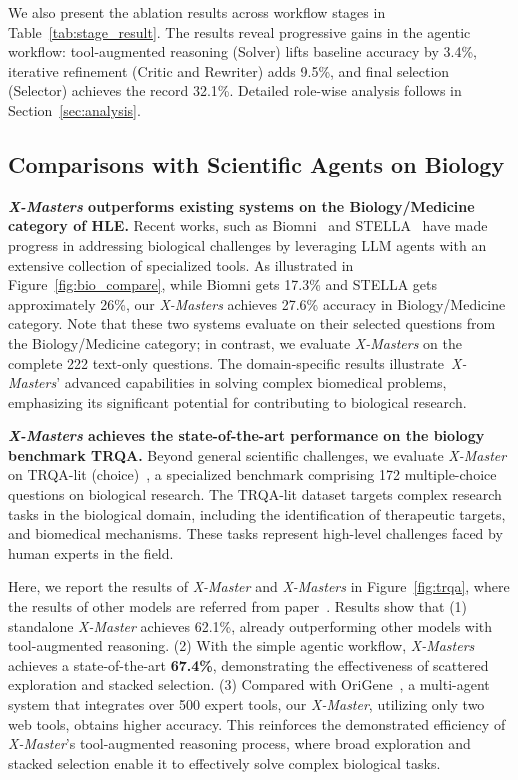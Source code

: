 \documentclass{article}
\begin{document}
We also present the ablation results across workflow stages in Table~\ref{tab:stage_result}. The results reveal progressive gains in the agentic workflow: tool-augmented reasoning (Solver) lifts baseline accuracy by 3.4\%, iterative refinement (Critic and Rewriter) adds 9.5\%, and final selection (Selector) achieves the record 32.1\%. Detailed role-wise analysis follows in Section~\ref{sec:analysis}. 

\subsection{Comparisons with Scientific Agents on Biology}
\textbf{\emph{X-Masters} outperforms existing systems on the Biology/Medicine category of HLE.} Recent works, such as Biomni~\citep{biomni} and STELLA~\citep{stella} have made progress in addressing biological challenges by leveraging LLM agents with an extensive collection of specialized tools. As illustrated in Figure~\ref{fig:bio_compare}, while Biomni gets 17.3\% and STELLA gets approximately 26\%, our \emph{X-Masters} achieves 27.6\% accuracy in Biology/Medicine category. Note that these two systems evaluate on their selected questions from the Biology/Medicine category; in contrast, we evaluate \emph{X-Masters} on the complete 222 text-only questions. The domain-specific results illustrate~\emph{X-Masters}' advanced capabilities in solving complex biomedical problems, emphasizing its significant potential for contributing to biological research.



\textbf{\emph{X-Masters} achieves the state-of-the-art performance on the biology benchmark TRQA.}
Beyond general scientific challenges, we evaluate \emph{X-Master} on TRQA-lit (choice)~\citep{trqa}, a specialized benchmark comprising 172 multiple-choice questions on biological research. The TRQA-lit dataset targets complex research tasks in the biological domain, including the identification of therapeutic targets, and biomedical mechanisms. These tasks represent high-level challenges faced by human experts in the field.

Here, we report the results of \emph{X-Master} and \emph{X-Masters} in Figure~\ref{fig:trqa}, where the results of other models are referred from paper~\citep{trqa}. 
Results show that (1) standalone \emph{X-Master} achieves 62.1\%, already outperforming other models with tool-augmented reasoning. (2) With the simple agentic workflow, \emph{X-Masters} achieves a state-of-the-art \textbf{67.4\%}, demonstrating the effectiveness of scattered exploration and stacked selection. (3) Compared with OriGene~\citep{trqa}, a multi-agent system that integrates over 500 expert tools, our \emph{X-Master}, utilizing only two web tools, obtains higher accuracy. This reinforces the demonstrated efficiency of \emph{X-Master}’s tool-augmented reasoning process, where broad exploration and stacked selection enable it to effectively solve complex biological tasks.
\end{document}
